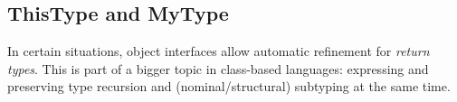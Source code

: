 
% 

\subsection{ThisType and MyType}

In certain situations, object interfaces allow automatic refinement for \emph{return
types}. This is part of a bigger topic in class-based languages: expressing and
preserving type recursion and (nominal/structural) subtyping at the same time.

